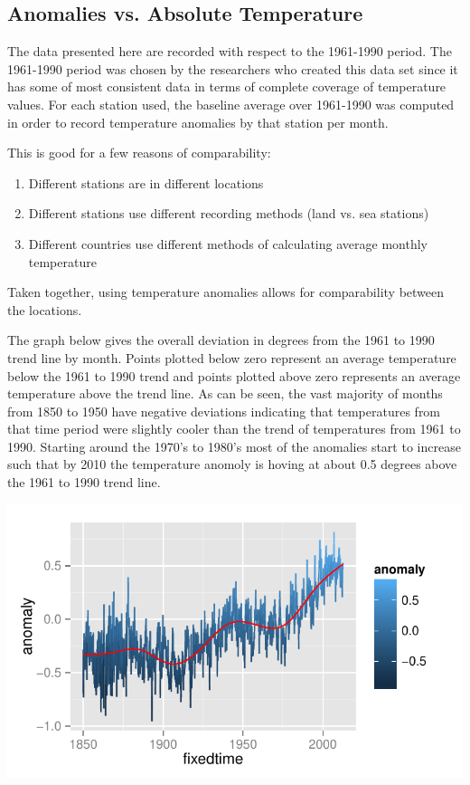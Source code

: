 \documentclass{article}\usepackage{graphicx, color}
\newenvironment{knitrout}{}{} %
\begin{document}
\subsection*{Anomalies vs. Absolute Temperature}
The data presented here are recorded with respect to the 1961-1990 period.  The 1961-1990 period was chosen by the researchers who created this data set since it has some of most consistent data in terms of complete coverage of temperature values. For each station used, the baseline average over 1961-1990 was computed in order to record temperature anomalies by that station per month.

This is good for a few reasons of comparability:
\begin{enumerate}
\item Different stations are in different locations
\item Different stations use different recording methods (land vs. sea stations)
\item Different countries use different methods of calculating average monthly temperature
\end{enumerate}
Taken together, using temperature anomalies allows for comparability between the locations.

The graph below gives the overall deviation in degrees from the 1961 to 1990 trend line by month. Points plotted below zero represent an average temperature below the 1961 to 1990 trend and points plotted above zero represents an average temperature above the trend line. As can be seen, the vast majority of months from 1850 to 1950 have negative deviations indicating that temperatures from that time period were slightly cooler than the trend of temperatures from 1961 to 1990. Starting around the 1970's to 1980's most of the anomalies start to increase such that by 2010 the temperature anomoly is hoving at about 0.5 degrees above the 1961 to 1990 trend line.

\begin{knitrout}
\color{fgcolor}\includegraphics[width=\linewidth]{figure/plot-trend} 
\end{knitrout}
\end{document}
